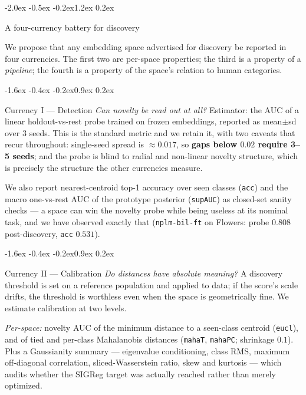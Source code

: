\documentclass{article}
\makeatletter
\renewcommand\section{\@startsection{section}{1}{\z@}%
  {-2.0ex \@plus -0.5ex \@minus -0.2ex}{1.2ex \@plus 0.2ex}%
  {\large\bf\raggedright}}
\renewcommand\subsection{\@startsection{subsection}{2}{\z@}%
  {-1.6ex \@plus -0.4ex \@minus -0.2ex}{0.9ex \@plus 0.2ex}%
  {\normalsize\bf\raggedright}}
\makeatother
\begin{document}
\section{A four-currency battery for discovery}
\label{sec:battery}

We propose that any embedding space advertised for discovery be reported in
four currencies. The first two are per-space properties; the third is a
property of a \emph{pipeline}; the fourth is a property of the space's relation
to human categories.

\subsection{Currency I --- Detection}
\emph{Can novelty be read out at all?} Estimator: the AUC of a linear
holdout-vs-rest probe trained on frozen embeddings, reported as mean$\pm$sd
over 3 seeds. This is the standard metric and we retain it, with two caveats
that recur throughout: single-seed spread is $\approx0.017$, so \textbf{gaps
below $0.02$ require 3--5 seeds}; and the probe is blind to radial and
non-linear novelty structure, which is precisely the structure the other
currencies measure.

We also report nearest-centroid top-1 accuracy over seen classes (\texttt{acc})
and the macro one-vs-rest AUC of the prototype posterior (\texttt{supAUC}) as
closed-set sanity checks --- a space can win the novelty probe while being
useless at its nominal task, and we have observed exactly that
(\texttt{nplm-bil-ft} on Flowers: probe $0.808$ post-discovery, \texttt{acc}
$0.531$).

\subsection{Currency II --- Calibration}
\emph{Do distances have absolute meaning?} A discovery threshold is set on a
reference population and applied to data; if the score's scale drifts, the
threshold is worthless even when the space is geometrically fine. We estimate
calibration at two levels.

\emph{Per-space:} novelty AUC of the minimum distance to a seen-class centroid
(\texttt{eucl}), and of tied and per-class Mahalanobis distances
(\texttt{mahaT}, \texttt{mahaPC}; shrinkage $0.1$). Plus a Gaussianity summary
--- eigenvalue conditioning, class RMS, maximum off-diagonal correlation,
sliced-Wasserstein ratio, skew and kurtosis --- which audits whether the SIGReg
target was actually reached rather than merely optimized.
\end{document}
